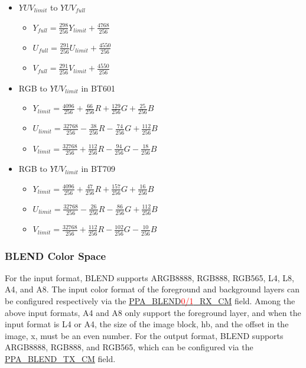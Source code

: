 \documentclass[main\_\_EN.tex]{subfiles}
\begin{document}
\begin{itemize}
    \item $YUV_{limit}$ to $YUV_{full}$
        \begin{itemize}
            \item $Y_{full} = \frac{298}{256} Y_{limit} + \frac{4768}{256}$
            \item $U_{full} = \frac{291}{256} U_{limit} + \frac{4550}{256}$
            \item $V_{full} = \frac{291}{256} V_{limit} + \frac{4550}{256}$
        \end{itemize}
    \item RGB to $YUV_{limit}$ in BT601
        \begin{itemize}
            \item $Y_{limit} = \frac{4096}{256} + \frac{66}{256}R + \frac{129}{256}G + \frac{25}{256}B$
            \item $U_{limit} = \frac{32768}{256} - \frac{38}{256}R - \frac{74}{256}G + \frac{112}{256}B$
            \item $V_{limit} = \frac{32768}{256} + \frac{112}{256}R - \frac{94}{256}G - \frac{18}{256}B$
        \end{itemize}
    \item RGB to $YUV_{limit}$ in BT709
        \begin{itemize}
            \item $Y_{limit} = \frac{4096}{256} + \frac{47}{256}R + \frac{157}{256}G + \frac{16}{256}B$
            \item $U_{limit} = \frac{32768}{256} - \frac{26}{256}R - \frac{86}{256}G + \frac{112}{256}B$
            \item $V_{limit} = \frac{32768}{256} + \frac{112}{256}R - \frac{102}{256}G - \frac{10}{256}B$
        \end{itemize}
\end{itemize}


\subsubsection{BLEND Color Space}
\label{sec:blend-color-space}

For the input format, BLEND supports ARGB8888, RGB888, RGB565, L4, L8, A4, and A8. The input color format of the foreground and background layers can be configured respectively via the \hyperref[fielddesc:PPABLEND0RXCM]{PPA\_BLEND\textcolor{red}{0/1}\_RX\_CM} field. Among the above input formats, A4 and A8 only support the foreground layer, and when the input format is L4 or A4, the size of the image block, hb, and the offset in the image, x, must be an even number. For the output format, BLEND supports ARGB8888, RGB888, and RGB565, which can be configured via the \hyperref[fielddesc:PPABLENDTXCM]{PPA\_BLEND\_TX\_CM} field.
\end{document}

